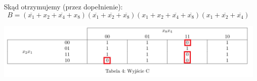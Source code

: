 \documentclass{article}
\begin{document}
                         
                        
            \FloatBarrier
            Skąd otrzymujemy (przez dopełnienie):
            $$ B = (\overline{x_1}+x_2+\overline{x_4}+x_8)(\overline{x_1}+\overline{x_2}+\overline{x_8})(x_1+x_2+\overline{x_4}+\overline{x_8})(x_1+\overline{x_2}+\overline{x_4})$$
            \begin{center}
                \includegraphics[width=18cm]{reports/img/Z1C_tab_4.png}\\
            \end{center}
                        
                         
\end{document}
